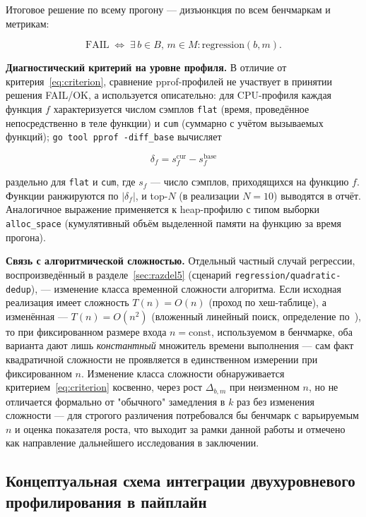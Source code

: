 Итоговое решение по всему прогону — дизъюнкция по всем бенчмаркам и
метрикам:

\begin{equation}
\mathrm{FAIL} \;\Longleftrightarrow\; \exists\, b \in B,\, m \in M : \mathrm{regression}(b, m).
\label{eq:fail}
\end{equation}

\textbf{Диагностический критерий на уровне профиля.} В отличие от
критерия~\eqref{eq:criterion}, сравнение pprof-профилей не участвует в
принятии решения FAIL/OK, а используется описательно: для CPU-профиля
каждая функция $f$ характеризуется числом сэмплов \texttt{flat} (время,
проведённое непосредственно в теле функции) и \texttt{cum} (суммарно с
учётом вызываемых функций); \texttt{go tool pprof -diff\_base} вычисляет

\begin{equation}
\delta_f = s_f^{\text{cur}} - s_f^{\text{base}}
\label{eq:profdiff}
\end{equation}

раздельно для \texttt{flat} и \texttt{cum}, где $s_f$ — число сэмплов,
приходящихся на функцию $f$. Функции ранжируются по $|\delta_f|$, и top-$N$
(в реализации $N=10$) выводятся в отчёт. Аналогичное выражение применяется
к heap-профилю с типом выборки \texttt{alloc\_space} (кумулятивный объём
выделенной памяти на функцию за время прогона).

\textbf{Связь с алгоритмической сложностью.} Отдельный частный случай
регрессии, воспроизведённый в разделе~\ref{sec:razdel5} (сценарий
\texttt{regression/\allowbreak quadratic-dedup}), — изменение класса временной
сложности алгоритма. Если исходная реализация имеет сложность $T(n) = O(n)$
(проход по хеш-таблице), а изменённая — $T(n) = O(n^2)$ (вложенный линейный
поиск, определение по~\cite{clrs}), то при фиксированном размере входа
$n=\text{const}$, используемом в бенчмарке, оба варианта дают лишь
\emph{константный} множитель времени выполнения — сам факт квадратичной
сложности не проявляется в единственном измерении при фиксированном $n$.
Изменение класса сложности обнаруживается критерием~\eqref{eq:criterion}
косвенно, через рост $\Delta_{b,m}$ при неизменном $n$, но не отличается
формально от "обычного" замедления в $k$ раз без изменения сложности — для
строгого различения потребовался бы бенчмарк с варьируемым $n$ и оценка
показателя роста, что выходит за рамки данной работы и отмечено как
направление дальнейшего исследования в заключении.

\subsection{Концептуальная схема интеграции двухуровневого профилирования в пайплайн}
\label{sec:2.3}

